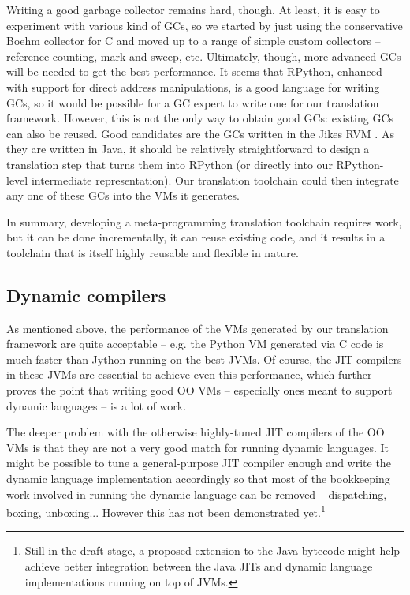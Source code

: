 \documentclass{llncs}
\begin{document}
Writing a good garbage collector remains hard, though.  At least, it is
easy to experiment with various kind of GCs, so we started by just using
the conservative Boehm \cite{Boehm} collector for C and moved up to a
range of simple custom collectors -- reference counting, mark-and-sweep,
etc.  Ultimately, though, more advanced GCs will be needed to get the
best performance.  It seems that RPython, enhanced with support for
direct address manipulations, is a good language for writing GCs, so it
would be possible for a GC expert to write one for our translation
framework.  However, this is not the only way to obtain good GCs:
existing GCs can also be reused.  Good candidates are the GCs written in
the Jikes RVM \cite{JikesGC}.  As they are written in Java, it should be
relatively straightforward to design a translation step that turns them
into RPython (or directly into our RPython-level intermediate
representation).  Our translation toolchain could then integrate any one
of these GCs into the VMs it generates.

In summary, developing a meta-programming translation toolchain requires
work, but it can be done incrementally, it can reuse existing code, and
it results in a toolchain that is itself highly reusable and flexible in
nature.

\subsection{Dynamic compilers}
\label{subsect:dynamic_compilers}

As mentioned above, the performance of the VMs generated by our
translation framework are quite acceptable -- e.g. the Python VM
generated via C code is much faster than Jython running on the best
JVMs.  Of course, the JIT compilers in these JVMs are essential to
achieve even this performance, which further proves the point that
writing good OO VMs -- especially ones meant to support dynamic
languages -- is a lot of work.

The deeper problem with the otherwise highly-tuned JIT compilers of the
OO VMs is that they are not a very good match for running dynamic
languages.  It might be possible to tune a general-purpose JIT compiler
enough and write the dynamic language implementation accordingly so
that most of the bookkeeping work involved in running the dynamic
language can be removed -- dispatching, boxing, unboxing...  However
this has not been demonstrated yet.\footnote
{Still in the draft stage, a proposed
extension to the Java bytecode \cite{invokedynamic} might help achieve
better integration between the Java JITs and dynamic language
implementations running on top of JVMs.}
\end{document}
